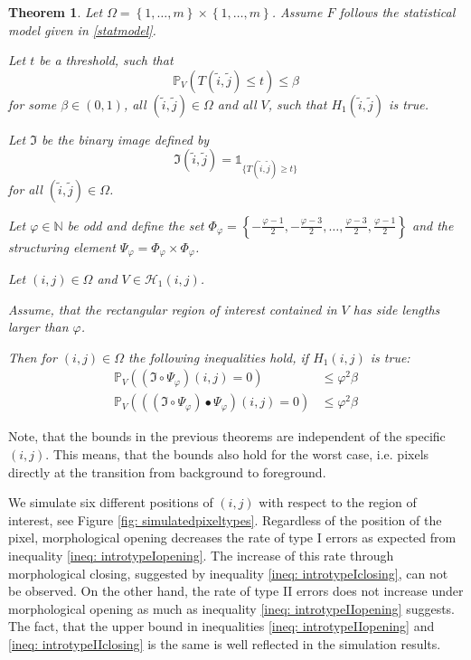 \documentclass[a4paper,12pt]{article}
\theoremstyle{plain}
\newtheorem{theorem}{Theorem}[section]
\theoremstyle{definition}
\begin{document}
\begin{theorem}
	Let $\Omega = \left\{ 1, \dots, m \right\} \times \left\{ 1, \dots, m \right\}$. Assume $F$ follows the statistical model given in \eqref{statmodel}.
	
	Let $t$ be a threshold, such that
	\begin{equation*}
		\mathbb{P}_V\left( T(\tilde{i}, \tilde{j}) \leq t \right) \leq \beta
	\end{equation*}
	for some $\beta \in (0, 1)$, all $(\tilde{i}, \tilde{j}) \in \Omega$ and all $V$, such that $H_1(\tilde{i}, \tilde{j})$ is true.
	
	Let $\mathfrak{I}$ be the binary image defined by
	\begin{equation*}
		\mathfrak{I}(\tilde{i}, \tilde{j}) = \mathds{1}_{ \{ T(\tilde{i}, \tilde{j}) \geq t \} }
	\end{equation*}
	for all $(\tilde{i}, \tilde{j}) \in \Omega$.
	
	Let $\varphi \in \mathbb{N}$ be odd and define the set $\Phi_\varphi = \left\{ -\frac{\varphi - 1}{2}, -\frac{\varphi - 3}{2}, \dots, \frac{\varphi - 3}{2}, \frac{\varphi - 1}{2} \right\}$ and the structuring element $\Psi_\varphi = \Phi_\varphi \times \Phi_\varphi$.
	
	Let $(i, j) \in \Omega$ and $V \in \mathcal{H}_1(i, j)$.
	
	Assume, that the rectangular region of interest contained in $V$ has side lengths larger than $\varphi$.
	
	Then for $(i, j) \in \Omega$ the following inequalities hold, if $H_1(i, j)$ is true:
	\begin{align}
		\mathbb{P}_V\left( (\mathfrak{I} \circ \Psi_\varphi)(i, j) = 0 \right) &\leq \varphi^2 \beta \label{ineq: introtypeIIopening} \\
		\mathbb{P}_V\left( ((\mathfrak{I} \circ \Psi_\varphi) \bullet \Psi_\varphi)(i, j) = 0 \right) &\leq \varphi^2 \beta \label{ineq: introtypeIIclosing}
	\end{align}
\end{theorem}

Note, that the bounds in the previous theorems are independent of the specific $(i, j)$. This means, that the bounds also hold for the worst case, i.e. pixels directly at the transition from background to foreground.

We simulate six different positions of $(i, j)$ with respect to the region of interest, see Figure \ref{fig: simulatedpixeltypes}. Regardless of the position of the pixel, morphological opening decreases the rate of type I errors as expected from inequality \eqref{ineq: introtypeIopening}. The increase of this rate through morphological closing, suggested by inequality \eqref{ineq: introtypeIclosing}, can not be observed. On the other hand, the rate of type II errors does not increase under morphological opening as much as inequality \eqref{ineq: introtypeIIopening} suggests. The fact, that the upper bound in inequalities \eqref{ineq: introtypeIIopening} and \eqref{ineq: introtypeIIclosing} is the same is well reflected in the simulation results.
\end{document}
